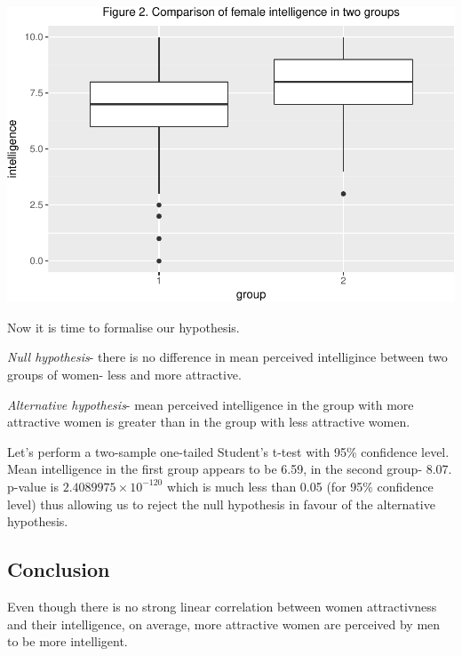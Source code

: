 \documentclass[]{article}
\begin{document}
\includegraphics{FemaleAttractivenessAndIntelligence_files/figure-latex/unnamed-chunk-6-1.pdf}

Now it is time to formalise our hypothesis.

\emph{Null hypothesis}- there is no difference in mean perceived
intelligince between two groups of women- less and more attractive.

\emph{Alternative hypothesis}- mean perceived intelligence in the group
with more attractive women is greater than in the group with less
attractive women.

Let's perform a two-sample one-tailed Student's t-test with 95\%
confidence level. Mean intelligence in the first group appears to be
6.59, in the second group- 8.07. p-value is
\(2.4089975\times 10^{-120}\) which is much less than 0.05 (for 95\%
confidence level) thus allowing us to reject the null hypothesis in
favour of the alternative hypothesis.

\subsection{Conclusion}\label{conclusion}

Even though there is no strong linear correlation between women
attractivness and their intelligence, on average, more attractive women
are perceived by men to be more intelligent.
\end{document}
